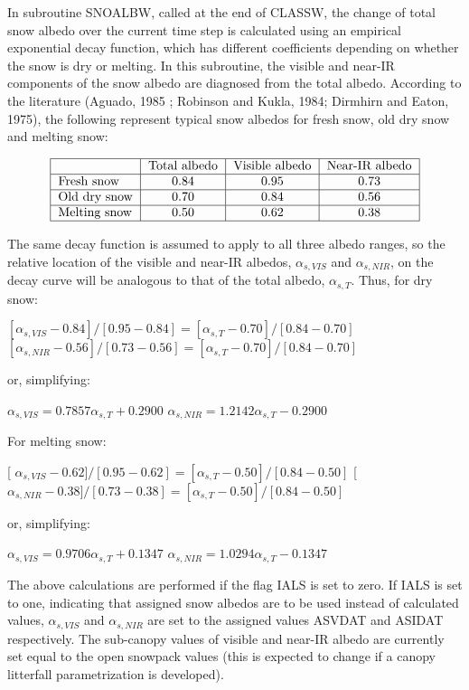 In subroutine S\+N\+O\+A\+L\+B\+W, called at the end of C\+L\+A\+S\+S\+W, the change of total snow albedo over the current time step is calculated using an empirical exponential decay function, which has different coefficients depending on whether the snow is dry or melting. In this subroutine, the visible and near-\/\+I\+R components of the snow albedo are diagnosed from the total albedo. According to the literature (Aguado, 1985 \cite{Aguado1985-fv} ; Robinson and Kukla, 1984; Dirmhirn and Eaton, 1975), the following represent typical snow albedos for fresh snow, old dry snow and melting snow\+:

\[ \begin{tabular} { | l | c | c | c | } \hline & Total albedo & Visible albedo & Near-IR albedo \\ \hline Fresh snow & 0.84 & 0.95 & 0.73 \\ \hline Old dry snow & 0.70 & 0.84 & 0.56 \\ \hline Melting snow & 0.50 & 0.62 & 0.38 \\ \hline \end{tabular} \]

The same decay function is assumed to apply to all three albedo ranges, so the relative location of the visible and near-\/\+I\+R albedos, $\alpha_{s,VIS}$ and $\alpha_{s,NIR}$, on the decay curve will be analogous to that of the total albedo, $\alpha_{s,T}$. Thus, for dry snow\+:

$[\alpha_{s,VIS} - 0.84]/[0.95-0.84] = [\alpha_{s,T} - 0.70]/[0.84-0.70]$ $[\alpha_{s,NIR} - 0.56]/[0.73-0.56] = [\alpha_{s,T} - 0.70]/[0.84-0.70]$

or, simplifying\+:

$\alpha_{s,VIS} = 0.7857 \alpha_{s,T} + 0.2900$ $\alpha_{s,NIR} = 1.2142 \alpha_{s,T} - 0.2900$

For melting snow\+:

\mbox{[} $\alpha_{s,VIS} - 0.62]/[0.95-0.62] = [\alpha_{s,T} - 0.50]/[0.84-0.50]$ \mbox{[} $\alpha_{s,NIR} - 0.38]/[0.73-0.38] = [\alpha_{s,T} - 0.50]/[0.84-0.50]$

or, simplifying\+:

$\alpha_{s,VIS} = 0.9706 \alpha_{s,T} + 0.1347$ $\alpha_{s,NIR} = 1.0294 \alpha_{s,T} - 0.1347$

The above calculations are performed if the flag I\+A\+L\+S is set to zero. If I\+A\+L\+S is set to one, indicating that assigned snow albedos are to be used instead of calculated values, $\alpha_{s,VIS}$ and $\alpha_{s,NIR}$ are set to the assigned values A\+S\+V\+D\+A\+T and A\+S\+I\+D\+A\+T respectively. The sub-\/canopy values of visible and near-\/\+I\+R albedo are currently set equal to the open snowpack values (this is expected to change if a canopy litterfall parametrization is developed).

